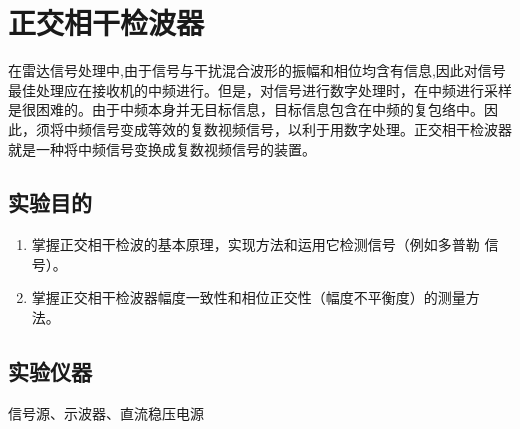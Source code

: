 \documentclass[12pt]{article}
\begin{document}
\setcounter{page}{1}
\section{正交相干检波器}
\setcounter{equation}{0}
\setcounter{table}{0}
\setcounter{figure}{0}
在雷达信号处理中,由于信号与干扰混合波形的振幅和相位均含有信息,因此对信号最佳处理应在接收机的中频进行。但是，对信号进行数字处理时，在中频进行采样是很困难的。由于中频本身并无目标信息，目标信息包含在中频的复包络中。因此，须将中频信号变成等效的复数视频信号，以利于用数字处理。正交相干检波器就是一种将中频信号变换成复数视频信号的装置。
\subsection{实验目的}
\begin{enumerate}
  \item 掌握正交相干检波的基本原理，实现方法和运用它检测信号（例如多普勒 信号）。
\item 掌握正交相干检波器幅度一致性和相位正交性（幅度不平衡度）的测量方 法。
\end{enumerate}
\subsection{实验仪器}
信号源、示波器、直流稳压电源
\end{document}
